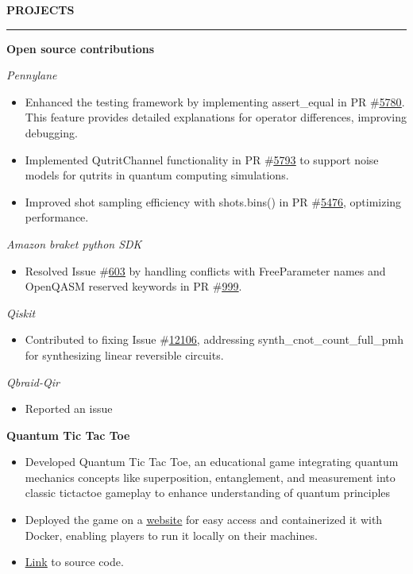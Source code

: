 \documentclass[a4paper,10pt]{article}
\let\oldhref\href
\renewcommand{\href}[2]{\oldhref{#1}{\uline{#2}}}
\newcommand{\cvHeaderOne}[1]{%
  \vspace*{1.5em}%
  {\noindent\large\textbf{\MakeUppercase{#1}}\par}%
  \noindent\rule{\linewidth}{0.4pt}%
  \vspace*{0.5em}%
}
\newcommand{\cvHeaderTwo}[2]{%
  \vspace{0.8em}%
  \noindent\textbf{\normalsize #1} \hfill \textit{#2}\par%
}
\newcommand{\cvHeaderThree}[1]{%
  \noindent\textit{#1}%
}
\newenvironment{cvItemList}{%
  \begin{itemize}%
    \setlength{\itemsep}{0.1em}%
    \setlength{\topsep}{0em}%
    \setlength{\partopsep}{0em}%
    \setlength{\parsep}{0em}%
    \setlength{\parskip}{0em}%
}{%
  \end{itemize}%
}
\begin{document}
\cvHeaderOne{Projects}

\cvHeaderTwo{Open source contributions}{}

\cvHeaderThree{Pennylane}
\begin{cvItemList}
\item Enhanced the testing framework by implementing assert\_equal in PR \#\href{https://github.com/PennyLaneAI/pennylane/pull/5780}{5780}. This feature provides detailed explanations for operator differences, improving debugging.
\item Implemented QutritChannel functionality in PR \#\href{https://github.com/PennyLaneAI/pennylane/pull/5793}{5793} to support noise models for qutrits in quantum computing simulations.
\item Improved shot sampling efficiency with shots.bins() in PR \#\href{https://github.com/PennyLaneAI/pennylane/pull/5476}{5476}, optimizing performance.
\end{cvItemList}

\cvHeaderThree{Amazon braket python SDK}
\begin{cvItemList}
\item Resolved Issue \#\href{https://github.com/amazon-braket/amazon-braket-sdk-python/issues/603}{603} by handling conflicts with FreeParameter names and OpenQASM reserved keywords in PR \#\href{https://github.com/amazon-braket/amazon-braket-sdk-python/pull/999}{999}. 
\end{cvItemList}

\cvHeaderThree{Qiskit}
\begin{cvItemList}
\item Contributed to fixing Issue \#\href{https://github.com/Qiskit/qiskit/issues/12106}{12106}, addressing synth\_cnot\_count\_full\_pmh for synthesizing linear reversible circuits.
\end{cvItemList}

\cvHeaderThree{Qbraid-Qir}
\begin{cvItemList}
\item Reported an issue 
\end{cvItemList}

\cvHeaderTwo{Quantum Tic Tac Toe}{}
\begin{cvItemList}
\item Developed Quantum Tic Tac Toe, an educational game integrating quantum mechanics concepts like superposition, entanglement, and measurement into classic tic\-tac\-toe gameplay to enhance understanding of quantum principles
\item Deployed the game on a \href{https://quantumtictactoe-ekm2cauxbumdelekkkaxqz.streamlit.app}{website} for easy access and containerized it with Docker, enabling players to run it locally on their machines.
\item \href{https://github.com/Tarun-Kumar07/QuantumTicTacToe}{Link} to source code.
\end{cvItemList}
\end{document}
